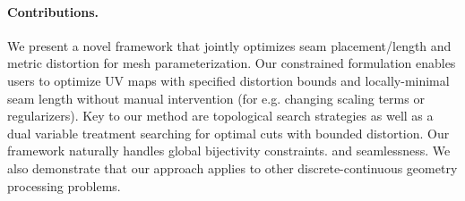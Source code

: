 \paragraph*{Contributions.} 
We present a novel framework that jointly optimizes seam placement/length and metric distortion for mesh parameterization. %
Our constrained formulation %
enables users to optimize UV maps with specified distortion bounds and %
locally-minimal seam length without manual intervention (for e.g. changing scaling terms or regularizers). 
%
Key to our method are topological search strategies as well as a dual variable treatment searching for optimal cuts with bounded distortion. Our framework naturally handles %
global bijectivity constraints. %
and seamlessness. %
We also demonstrate that our approach applies to other discrete-continuous geometry processing problems. %
